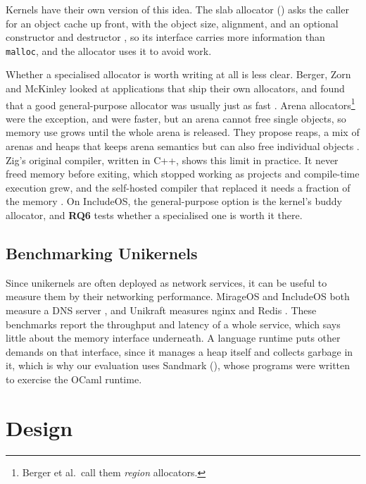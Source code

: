 \documentclass[12pt]{report}
\newcommand{\fullref}[1]{\Cref{#1}}
\renewcommand{\_}{\origunderscore\allowbreak}
\begin{document}
Kernels have their own version of this idea. The slab allocator (\fullref{sec:memory-allocation}) asks the caller for an object cache up front, with the object size, alignment, and an optional constructor and destructor \cite{bonwick1994slab}, so its interface carries more information than \texttt{malloc}, and the allocator uses it to avoid work.

Whether a specialised allocator is worth writing at all is less clear. Berger, Zorn and McKinley looked at applications that ship their own allocators, and found that a good general-purpose allocator was usually just as fast \cite{berger2002reconsidering}. Arena allocators\footnote{Berger et al.\ call them \emph{region} allocators.} were the exception, and were faster, but an arena cannot free single objects, so memory use grows until the whole arena is released. They propose reaps, a mix of arenas and heaps that keeps arena semantics but can also free individual objects \cite{berger2002reconsidering}. Zig's original compiler, written in C++, shows this limit in practice. It never freed memory before exiting, which stopped working as projects and compile-time execution grew, and the self-hosted compiler that replaced it needs a fraction of the memory \cite{kelley2022goodbyecpp}. On IncludeOS, the general-purpose option is the kernel's buddy allocator, and \textbf{RQ6} tests whether a specialised one is worth it there.

\section{Benchmarking Unikernels}
\label{sec:related-sandmark}

Since unikernels are often deployed as network services, it can be useful to measure them by their networking performance. MirageOS and IncludeOS both measure a DNS server \cite{madhavapeddy2013unikernels,bratterud2015includeos}, and Unikraft measures nginx and Redis \cite{kuenzer2021unikraft}. These benchmarks report the throughput and latency of a whole service, which says little about the memory interface underneath. A language runtime puts other demands on that interface, since it manages a heap itself and collects garbage in it, which is why our evaluation uses Sandmark (\fullref{sec:bg-sandmark}), whose programs were written to exercise the OCaml runtime.

\chapter{Design}
\label{sec:design}
\end{document}
